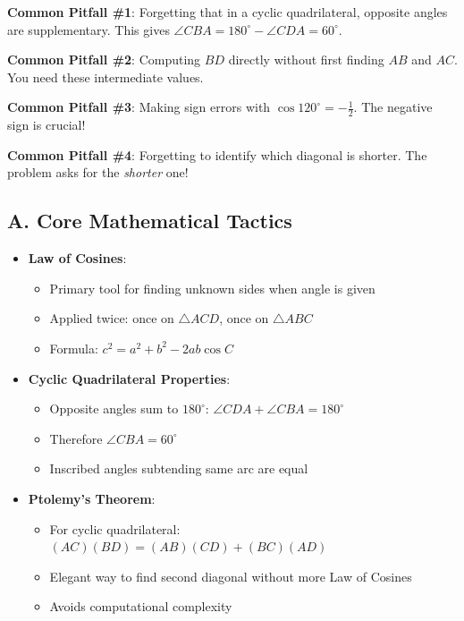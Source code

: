 \documentclass[11pt]{article}
\begin{document}
\begin{warningbox}
\textbf{Common Pitfall \#1}: Forgetting that in a cyclic quadrilateral, opposite angles are supplementary. This gives $\angle CBA = 180^\circ - \angle CDA = 60^\circ$.

\textbf{Common Pitfall \#2}: Computing $BD$ directly without first finding $AB$ and $AC$. You need these intermediate values.

\textbf{Common Pitfall \#3}: Making sign errors with $\cos 120^\circ = -\frac{1}{2}$. The negative sign is crucial!

\textbf{Common Pitfall \#4}: Forgetting to identify which diagonal is shorter. The problem asks for the \emph{shorter} one!
\end{warningbox}

\begin{tacticalbox}
\subsection*{A. Core Mathematical Tactics}
\begin{itemize}[leftmargin=*]
    \item \textbf{Law of Cosines}: 
    \begin{itemize}
        \item Primary tool for finding unknown sides when angle is given
        \item Applied twice: once on $\triangle ACD$, once on $\triangle ABC$
        \item Formula: $c^2 = a^2 + b^2 - 2ab\cos C$
    \end{itemize}
    
    \item \textbf{Cyclic Quadrilateral Properties}: 
    \begin{itemize}
        \item Opposite angles sum to $180^\circ$: $\angle CDA + \angle CBA = 180^\circ$
        \item Therefore $\angle CBA = 60^\circ$
        \item Inscribed angles subtending same arc are equal
    \end{itemize}
    
    \item \textbf{Ptolemy's Theorem}: 
    \begin{itemize}
        \item For cyclic quadrilateral: $(AC)(BD) = (AB)(CD) + (BC)(AD)$
        \item Elegant way to find second diagonal without more Law of Cosines
        \item Avoids computational complexity
    \end{itemize}
    

\end{itemize}
\end{tacticalbox}
\end{document}
